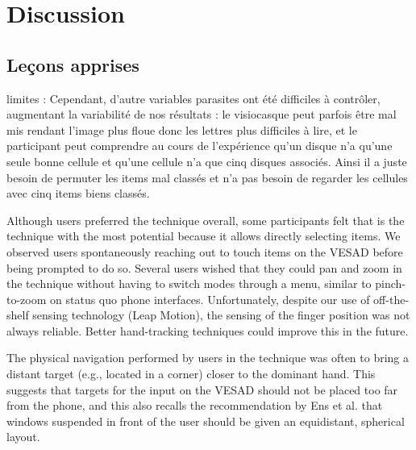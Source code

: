 \chapter{Discussion}
\label{ch:discussion}

\section{Leçons apprises}
\label{sec:discussion_lessons}

limites : Cependant, d'autre variables parasites ont été difficiles à contrôler, augmentant la variabilité de nos résultats : le visiocasque peut parfois être mal mis rendant l'image plus floue donc les lettres plus difficiles à lire, et le participant peut comprendre au cours de l'expérience qu'un disque n'a qu'une seule bonne cellule et qu'une cellule n'a que cinq disques associés. Ainsi il a juste besoin de permuter les items mal classés et n'a pas besoin de regarder les cellules avec cinq items biens classés.

Although users preferred the  technique overall, some participants felt that  is the technique with the most potential because it allows directly selecting items. We observed users spontaneously reaching out to touch items on the VESAD before being prompted to do so. Several users wished that they could pan and zoom in the  technique without having to switch modes through a menu, similar to pinch-to-zoom on status quo phone interfaces. Unfortunately, despite our use of off-the-shelf sensing technology (Leap Motion), the sensing of the finger position was not always reliable. Better hand-tracking techniques \cite{Taylor2016} could improve this in the future.

The physical navigation performed by users in the  technique was often to bring a distant target (e.g., located in a corner) closer to the dominant hand. This suggests that targets for the input on the VESAD should not be placed too far from the phone, and this also recalls the recommendation by Ens et al. \cite{Ens2014} that windows suspended in front of the user should be given an equidistant, spherical layout.

